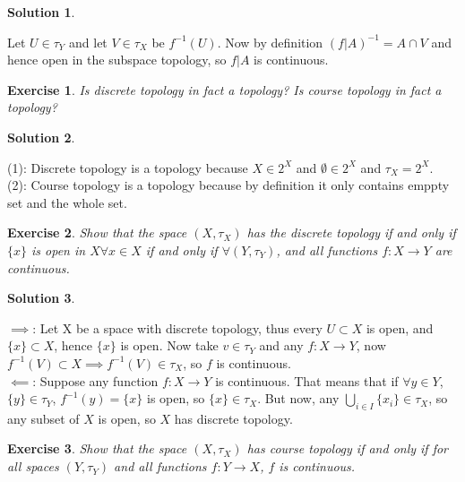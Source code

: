 \documentclass[11pt,a4paper]{article}
\newtheorem{Ex}{Exercise}
\newtheorem{Sol}{Solution}
\begin{document}
\begin{Sol} \end{Sol}
\noindent Let $U \in \tau_Y$ and let $V \in \tau_X$ be $f^{-1}(U)$. Now by definition $(f|A)^{-1} = A \cap V$ and hence open in the subspace topology, so $f|A$ is continuous.

\begin{Ex}
	Is discrete topology in fact a topology? Is course topology in fact a topology?
\end{Ex}

\begin{Sol} \end{Sol}
\noindent (1): Discrete topology is a topology because $X \in 2^X$ and $\emptyset \in 2^X$ and $\tau_X = 2^X$. \\
\noindent (2): Course topology is a topology because by definition it only contains emppty set and the whole set.

\begin{Ex}
	Show that the space $(X, \tau_X)$ has the discrete topology if and only if $\{x\}$ is open in $X \forall x \in X$ if and only if $\forall (Y, \tau_Y)$, and all functions $f: X \rightarrow Y$ are continuous. 
\end{Ex}

\begin{Sol} \end{Sol}
\noindent $\implies$: Let X be a space with discrete topology, thus every $U \subset X$ is open, and $\{x\} \subset X$, hence $\{x\}$ is open. Now take $v \in \tau_Y$ and any $f : X \rightarrow Y$, now $f^{-1}(V) \subset X \implies f^{-1}(V) \in \tau_X$, so $f$ is continuous. \\

\noindent $\impliedby$: Suppose any function $f: X \rightarrow Y$ is continuous. That means that if $\forall y \in Y$, $\{y\} \in \tau_Y$, $f^{-1}(y) = \{x\}$ is open, so $\{x\} \in \tau_X$. But now, any $\bigcup_{i \in I}\{x_i\} \in \tau_X$, so any subset of $X$ is open, so $X$ has discrete topology.

\begin{Ex}
	Show that the space $(X, \tau_X)$ has course topology if and only if for all spaces $(Y, \tau_Y)$ and all functions $f: Y \rightarrow X$, $f$ is continuous. 
\end{Ex}
\end{document}

